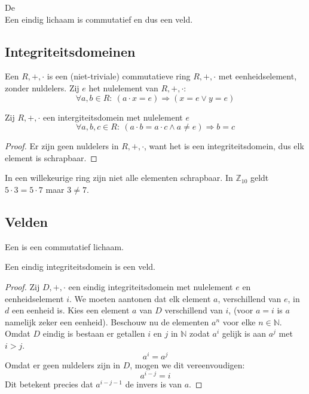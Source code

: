 \documentclass[main.tex]{subfiles}
\begin{document}
\begin{st}
  \label{st:stelling-van-wedderburn}
  De \\
  Een eindig lichaam is commutatief en dus een veld.
  \zb
\end{st}

\subsection{Integriteitsdomeinen}
\label{sec:integriteitsdomeinen}

\begin{de}
  \label{de:integriteitsdomein}
  Een  $R,+,\cdot$ is een (niet-triviale) commutatieve ring $R,+,\cdot$ met eenheidselement, zonder nuldelers.
  Zij $e$ het nulelement van $R,+,\cdot$:
  \[ \forall a, b \in R:\ (a \cdot x = e) \Rightarrow (x = e \vee y = e) \]
\end{de}

\begin{ei}
  Zij $R,+,\cdot$ een intergiteitsdomein met nulelement $e$
  \[ \forall a,b,c \in R:\ (a\cdot b = a\cdot c \wedge a \neq e) \Rightarrow b = c \]

  \begin{proof}
    Er zijn geen nuldelers in $R,+,\cdot$, want het is een integriteitsdomein, dus elk element is schrapbaar.
  \end{proof}
\end{ei}

\begin{opm}
  In een willekeurige ring zijn niet alle elementen schrapbaar.
  In $\mathbb{Z}_{10}$ geldt $5\cdot 3 = 5 \cdot 7$ maar $3 \neq 7$.
\end{opm}

\subsection{Velden}
\label{sec:velden}

\begin{de}
  \label{de:veld}
  Een  is een commutatief lichaam.
\end{de}

\begin{st}
  Een eindig integriteitsdomein is een veld.

  \begin{proof}
    Zij $D,+,\cdot$ een eindig integriteitsdomein met nulelement $e$ en eenheidselement $i$.
    We moeten aantonen dat elk element $a$, verschillend van $e$, in $d$ een eenheid is.
    Kies een element $a$ van $D$ verschillend van $i$, (voor $a=i$ is $a$ namelijk zeker een eenheid).
    Beschouw nu de elementen $a^{n}$ voor elke $n\in \mathbb{N}$.
    Omdat $D$ eindig is bestaan er getallen $i$ en $j$ in $\mathbb{N}$ zodat $a^{i}$ gelijk is aan $a^{j}$ met $i > j$.
    \[ a^{i} = a^{j} \]
    Omdat er geen nuldelers zijn in $D$, mogen we dit vereenvoudigen:
    \[ a^{i-j} = i \]
    Dit betekent precies dat $a^{i-j-1}$ de invers is van $a$.
  \end{proof}
\end{st}
\end{document}
